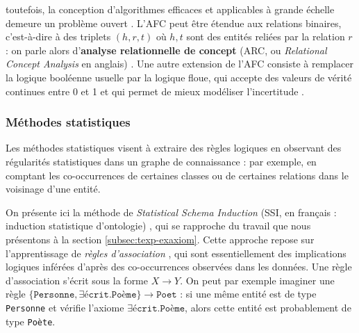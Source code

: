 toutefois, la conception d'algorithmes efficaces et applicables à grande échelle demeure un problème ouvert %
\cite{li2016approximate, zhang2019new}.
L'AFC peut être étendue aux relations binaires, c'est-à-dire à des triplets $(h, r, t)$ où $h, t$ sont des entités reliées par la relation $r$ : on parle alors d'\textbf{analyse relationnelle de concept} (ARC, ou \textit{Relational Concept Analysis} en anglais) \cite{bendaoud2008rcafca}. Une autre extension de l'AFC consiste à remplacer la logique booléenne usuelle par la logique floue, qui accepte des valeurs de vérité continues entre 0 et 1 et qui permet de mieux modéliser l'incertitude \cite{de2012hierarchical, mao2019construction}.
\subsubsection{Méthodes statistiques}

Les méthodes statistiques visent à extraire des règles logiques en observant des régularités statistiques dans un graphe de connaissance : par exemple, en comptant les co-occurrences de certaines classes ou de certaines relations dans le voisinage d'une entité. 

On présente ici la méthode de \textit{Statistical Schema Induction} (SSI, en français : induction statistique d'ontologie) \cite{volker2011statistical}, qui se rapproche du travail que nous présentons à la section \ref{subsec:texp-exaxiom}. Cette approche repose sur l'apprentissage de \textit{règles d'association} \cite{zhang2003association}, qui sont essentiellement des implications logiques inférées d'après des co-occurrences observées dans les données. 
Une règle d'association s'écrit sous la forme $X \rightarrow Y$. On peut par exemple imaginer une règle $\{\texttt{Personne}, \exists \texttt{écrit}.\texttt{Poème} \} \rightarrow \texttt{Poet}$ : si une même entité est de type \texttt{Personne} et vérifie l'axiome $\exists \texttt{écrit}.\texttt{Poème}$, alors cette entité est probablement de type \texttt{Poète}.

